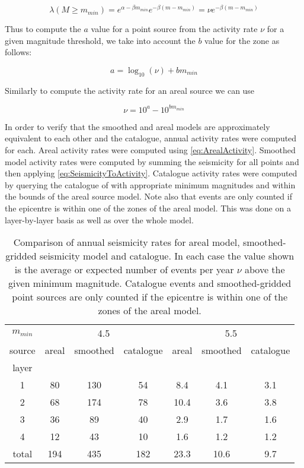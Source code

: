 \documentclass{article}
\begin{document}
$$ \lambda(M \geq m_{min}) = e^{\alpha - \beta m_{min}} e^{-\beta (m - m_{min})} = \nu e^{-\beta (m - m_{min})} $$

Thus to compute the $a$ value for a point source from the activity rate $\nu$ for a given magnitude threshold, we take into account the $b$ value for the zone as follows:

$$a = \log_{10}(\nu) + b m_{min} $$

Similarly to compute the activity rate for an areal source we can use

\begin{equation} \label{eq:ArealActivity} 
\nu = 10^a - 10^{b m_{min}}
\end{equation}

In order to verify that the smoothed and areal models are approximately equivalent to each other and the catalogue, annual activity rates were computed for each.
Areal activity rates were computed using \eqref{eq:ArealActivity}.
Smoothed model activity rates were computed by summing the seismicity for all points and then applying \eqref{eq:SeismicityToActivity}.
Catalogue activity rates were computed by querying the catalogue of \cite{nath2010earthquake} with appropriate minimum magnitudes and within the bounds of the areal source model.
Note also that events are only counted if the epicentre is within one of the zones of the areal model.
This was done on a layer-by-layer basis as well as over the whole model.

\begin{table}
\caption[Comparison of annual seismicity rates]{Comparison of annual seismicity rates for areal model, smoothed-gridded seismicity model and catalogue.
In each case the value shown is the average or expected number of events per year $\nu$ above the given minimum magnitude.
Catalogue events and smoothed-gridded point sources are only counted if the epicentre is within one of the zones of the areal model.}
\label{table:Rates}
\centering
\begin{tabular}{ccccccc}
\toprule
$m_{min}$ & \multicolumn{3}{c}{4.5} & \multicolumn{3}{c}{5.5} \\
source &  areal & smoothed & catalogue & areal & smoothed & catalogue \\
\midrule
layer   &      &        &         &       &          &           \\
1       &   80 &    130 &      54 &   8.4 &      4.1 &       3.1 \\
2       &   68 &    174 &      78 &  10.4 &      3.6 &       3.8 \\
3       &   36 &     89 &      40 &   2.9 &      1.7 &       1.6 \\
4       &   12 &     43 &      10 &   1.6 &      1.2 &       1.2 \\
total   &  194 &    435 &     182 &  23.3 &     10.6 &       9.7 \\
\bottomrule
\end{tabular}
\end{table}
\end{document}
